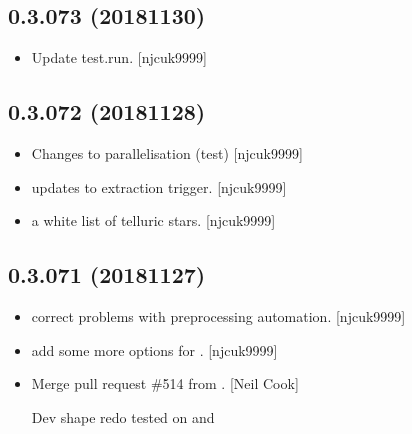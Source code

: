 \documentclass[a4paper,10pt,english]{report}
\begin{document}
\subsection{0.3.073 (2018\sphinxhyphen{}11\sphinxhyphen{}30)}
\label{\detokenize{misc/changelog:id269}}\begin{itemize}
\item {} 
Update test.run. {[}njcuk9999{]}

\end{itemize}


\subsection{0.3.072 (2018\sphinxhyphen{}11\sphinxhyphen{}28)}
\label{\detokenize{misc/changelog:id270}}\begin{itemize}
\item {} 
Changes to parallelisation (test) {[}njcuk9999{]}

\item {} 
 \sphinxhyphen{} updates to extraction trigger. {[}njcuk9999{]}

\item {} 
 \sphinxhyphen{} a white list of telluric stars. {[}njcuk9999{]}

\end{itemize}


\subsection{0.3.071 (2018\sphinxhyphen{}11\sphinxhyphen{}27)}
\label{\detokenize{misc/changelog:id271}}\begin{itemize}
\item {} 
 \sphinxhyphen{} correct problems with pre\sphinxhyphen{}processing automation.
{[}njcuk9999{]}

\item {} 
 \sphinxhyphen{} add some more options for .
{[}njcuk9999{]}

\item {} 
Merge pull request \#514 from . {[}Neil Cook{]}

Dev shape redo \sphinxhyphen{} tested on  and 

\end{itemize}
\end{document}
